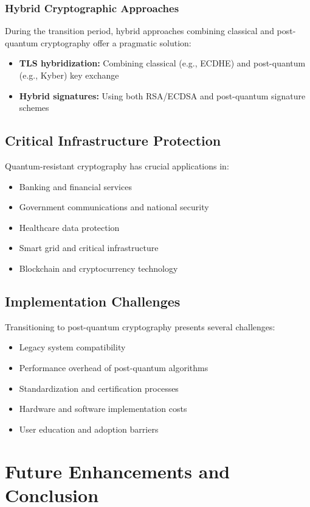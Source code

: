 \documentclass{article}
\begin{document}
\subsubsection{Hybrid Cryptographic Approaches}
During the transition period, hybrid approaches combining classical and post-quantum cryptography offer a pragmatic solution:

\begin{itemize}
    \item \textbf{TLS hybridization:} Combining classical (e.g., ECDHE) and post-quantum (e.g., Kyber) key exchange
    \item \textbf{Hybrid signatures:} Using both RSA/ECDSA and post-quantum signature schemes
\end{itemize}

\subsection{Critical Infrastructure Protection}
Quantum-resistant cryptography has crucial applications in:
\begin{itemize}
    \item Banking and financial services
    \item Government communications and national security
    \item Healthcare data protection
    \item Smart grid and critical infrastructure
    \item Blockchain and cryptocurrency technology
\end{itemize}

\subsection{Implementation Challenges}
Transitioning to post-quantum cryptography presents several challenges:
\begin{itemize}
    \item Legacy system compatibility
    \item Performance overhead of post-quantum algorithms
    \item Standardization and certification processes
    \item Hardware and software implementation costs
    \item User education and adoption barriers
\end{itemize}

\section{Future Enhancements and Conclusion}
\end{document}
